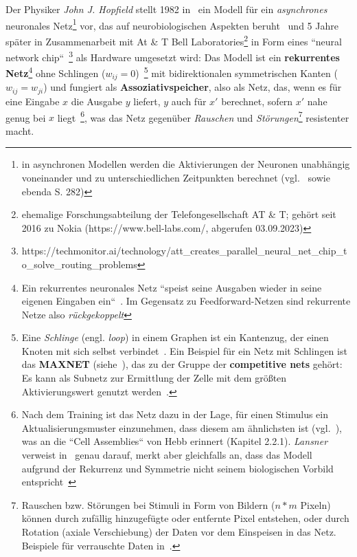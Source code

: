 Der Physiker \textit{John J. Hopfield} stellt 1982 in~\cite{Hop82} ein Modell für ein \textit{asynchrones} neuronales Netz\footnote{
    in asynchronen Modellen werden die Aktivierungen der Neuronen unabhängig voneinander und zu unterschiedlichen Zeitpunkten berechnet (vgl.~\cite[49]{Roj93} sowie ebenda S. 282)
}  vor, das auf neurobiologischen Aspekten beruht~\cite[2554]{Hop82} und 5 Jahre später in Zusammenarbeit mit At & T Bell Laboratories\footnote{
    ehemalige Forschungsabteilung der Telefongesellschaft AT \& T;  gehört seit 2016 zu Nokia (https://www.bell-labs.com/, abgerufen 03.09.2023)
} in Form eines ``neural network chip``~\cite[457]{AR88}\footnote{
    https://techmonitor.ai/technology/att\_creates\_parallel\_neural\_net\_chip\_to\_solve\_routing\_problems
} als Hardware umgesetzt wird: Das Modell ist ein \textbf{rekurrentes Netz}\footnote{
Ein rekurrentes neuronales Netz ``speist seine Ausgaben wieder in seine eigenen Eingaben ein``~\cite[847]{RN09}. Im Gegensatz zu Feedforward-Netzen sind rekurrente Netze also \textit{rückgekoppelt}
} ohne Schlingen ($w_{ij} = 0$)~\cite[291]{Ert21b}\footnote{ Eine \textit{Schlinge} (engl. \textit{loop}) in einem Graphen ist ein Kantenzug, der einen Knoten mit sich selbst verbindet~\cite[30]{Die17}. Ein Beispiel für ein Netz mit Schlingen ist das \textbf{MAXNET} (siehe~\cite{Lip87}), das zu der Gruppe der \textbf{competitive nets} gehört: Es kann als Subnetz zur Ermittlung der Zelle mit dem größten Aktivierungswert genutzt werden~\cite[158 f.]{Fau94}.
} mit bidirektionalen symmetrischen Kanten ($w_{ij} = w_{ji}$) und fungiert als \textbf{Assoziativspeicher}, also als Netz, das, wenn es für eine Eingabe $x$ die Ausgabe $y$ liefert, $y$ auch für $x'$ berechnet, sofern $x'$ nahe genug bei $x$ liegt~\cite[251]{Roj93}\footnote{
    Nach dem Training ist das Netz dazu in der Lage, für einen Stimulus ein Aktualisierungsmuster einzunehmen, dass diesem am ähnlichsten ist (vgl.~\cite[882]{RN09}), was an die ``Cell Assemblies`` von Hebb erinnert (Kapitel 2.2.1). \textit{Lansner} verweist in~\cite[179]{Lan09} genau darauf, merkt aber gleichfalls an, dass das Modell aufgrund der Rekurrenz und Symmetrie nicht seinem biologischen Vorbild entspricht~\cite[180]{Lan09}
}, was das Netz gegenüber \textit{Rauschen} und \textit{Störungen}\footnote{
    Rauschen bzw. Störungen bei Stimuli in Form von Bildern ($n * m$ Pixeln) können durch zufällig hinzugefügte oder entfernte Pixel entstehen, oder durch Rotation (axiale Verschiebung) der Daten vor dem Einspeisen in das Netz. Beispiele für verrauschte Daten in~\cite[294]{Ert21b}.
} resistenter macht.
